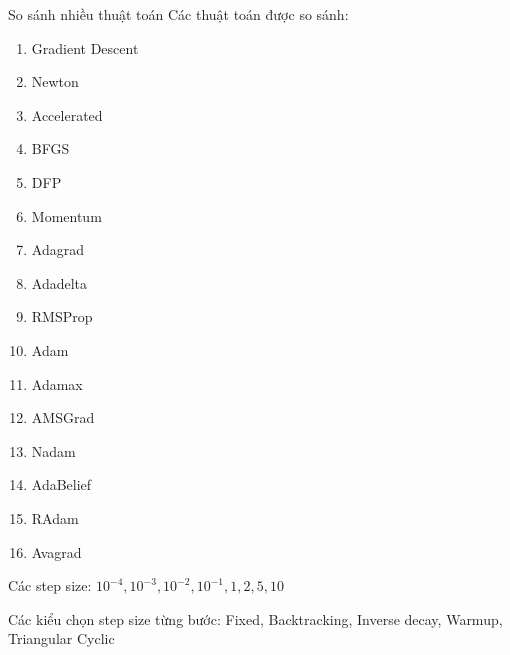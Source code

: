 \documentclass[10pt]{beamer}
\theoremstyle{remark}
\theoremstyle{definition}
\begin{document}
\begin{frame}{So sánh nhiều thuật toán}
	Các thuật toán được so sánh:
	\begin{multicols}{3}
	\begin{enumerate}
		\item Gradient Descent
  		\item Newton
    	\item Accelerated
     	\item BFGS
      	\item DFP
        \item Momentum
        \item Adagrad
        \item Adadelta
        \item RMSProp
        \item Adam
        \item Adamax
        \item AMSGrad
        \item Nadam
        \item AdaBelief
        \item RAdam
        \item Avagrad    
	\end{enumerate}
	\end{multicols}
	Các step size: $10^{-4}, 10^{-3}, 10^{-2}, 10^{-1}, 1, 2, 5, 10$
	
	Các kiểu chọn step size từng bước: Fixed, Backtracking, Inverse decay, Warmup, Triangular Cyclic

\end{frame}
\end{document}
